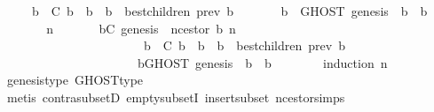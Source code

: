 \begin{isabellebody}
\ \ \ \ {\isacharparenleft}{\isasymforall}\ b{\isacharprime}\ {\isasymin}\ C{\isachardot}\ b{\isacharprime}\ {\isasymdownharpoonright}\ b\ {\isasymlongrightarrow}\ b{\isacharprime}\ {\isasymin}\ best{\isacharunderscore}children\ {\isacharparenleft}prev\ b{\isacharprime}{\isacharcomma}\ {\isasymsigma}{\isacharparenright}{\isacharparenright}\isanewline
\ \ \ \ {\isasymlongrightarrow}\ {\isacharparenleft}{\isasymforall}\ b{\isacharprime}{\isacharprime}\ {\isasymin}\ GHOST\ {\isacharparenleft}{\isacharbraceleft}genesis{\isacharbraceright}{\isacharcomma}\ {\isasymsigma}{\isacharparenright}{\isachardot}\ b\ {\isasymdownharpoonright}\ b{\isacharprime}{\isacharprime}{\isacharparenright}{\isachardoublequoteclose}\isanewline
\ \ \isamarkupfalse%
\ {\isacharminus}\isanewline
\ \ \ \ \isamarkupfalse%
\ n\isanewline
\ \ \ \ \isamarkupfalse%
\ {\isachardoublequoteopen}{\isasymforall}{\isasymsigma}{\isasymin}{\isasymSigma}{\isachardot}\ {\isasymforall}b{\isasymin}C{\isachardot}\ genesis\ {\isacharequal}\ n{\isacharunderscore}cestor\ {\isacharparenleft}b{\isacharcomma}\ n{\isacharparenright}\ {\isasymand}\isanewline
\ \ \ \ \ \ \ \ \ \ \ \ \ \ \ \ \ \ \ \ \ \ {\isacharparenleft}{\isasymforall}\ b{\isacharprime}\ {\isasymin}\ C{\isachardot}\ b{\isacharprime}\ {\isasymdownharpoonright}\ b\ {\isasymlongrightarrow}\ b{\isacharprime}\ {\isasymin}\ best{\isacharunderscore}children\ {\isacharparenleft}prev\ b{\isacharprime}{\isacharcomma}\ {\isasymsigma}{\isacharparenright}{\isacharparenright}\ {\isasymlongrightarrow}\isanewline
\ \ \ \ \ \ \ \ \ \ \ \ \ \ \ \ \ \ \ \ \ \ {\isacharparenleft}{\isasymforall}b{\isacharprime}{\isacharprime}{\isasymin}GHOST\ {\isacharparenleft}{\isacharbraceleft}genesis{\isacharbraceright}{\isacharcomma}\ {\isasymsigma}{\isacharparenright}{\isachardot}\ b\ {\isasymdownharpoonright}\ b{\isacharprime}{\isacharprime}{\isacharparenright}{\isachardoublequoteclose}\isanewline
\ \ \ \ \ \ \isamarkupfalse%
\ {\isacharparenleft}induction\ n{\isacharparenright}\ \isanewline
\ \ \ \ \ \ \isamarkupfalse%
\ genesis{\isacharunderscore}type\ GHOST{\isacharunderscore}type\isanewline
\ \ \ \ \ \ \isamarkupfalse%
\ {\isacharparenleft}metis\ contra{\isacharunderscore}subsetD\ empty{\isacharunderscore}subsetI\ insert{\isacharunderscore}subset\ n{\isacharunderscore}cestor{\isachardot}simps{\isacharparenleft}{}{\isacharparenright}{\isacharparenright}\isanewline
\ \ \ \ \isamarkupfalse%
\ {\isacharminus}\isanewline
\ \ \ \ \ \ \isamarkupfalse%

\end{isabellebody}
